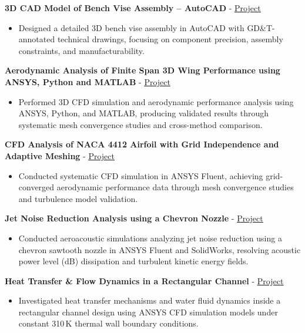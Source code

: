 \documentclass[10pt, letterpaper]{article}
\newcommand{\projheadlink}[3]{\vspace{5pt}\textbf{#1} - \href{#3}{\textcolor{linkblue}{\underline{#2}}}\par\vspace{1pt}}
\begin{document}
\projheadlink{3D CAD Model of Bench Vise Assembly -- AutoCAD}{Project}{https://www.linkedin.com/posts/jaykumar-prajapati_autocad-3dmodeling-mechanicalengineering-activity-7296754704766681088-dPDm}
\begin{itemize}
  \item Designed a detailed 3D bench vise assembly in AutoCAD with GD\&T-annotated technical drawings, focusing on component precision, assembly constraints, and manufacturability.
\end{itemize}

\projheadlink{Aerodynamic Analysis of Finite Span 3D Wing Performance using ANSYS, Python and MATLAB}{Project}{https://www.linkedin.com/posts/jaykumar-prajapati_aerodynamics-cfd-finitespanwing-activity-7300952489443434497-08Zf}
\begin{itemize}
  \item Performed 3D CFD simulation and aerodynamic performance analysis using ANSYS, Python, and MATLAB, producing validated results through systematic mesh convergence studies and cross-method comparison.
\end{itemize}

\projheadlink{CFD Analysis of NACA 4412 Airfoil with Grid Independence and Adaptive Meshing}{Project}{https://www.linkedin.com/posts/jaykumar-prajapati_cfd-aerodynamics-engineering-activity-7301811668550856706-MpND}
\begin{itemize}
  \item Conducted systematic CFD simulation in ANSYS Fluent, achieving grid-converged aerodynamic performance data through mesh convergence studies and turbulence model validation.
\end{itemize}

\projheadlink{Jet Noise Reduction Analysis using a Chevron Nozzle}{Project}{https://www.linkedin.com/posts/jaykumar-prajapati_cfd-acoustics-jetnoise-activity-7314003365615542273-X1GT}
\begin{itemize}
  \item Conducted aeroacoustic simulations analyzing jet noise reduction using a chevron sawtooth nozzle in ANSYS Fluent and SolidWorks, resolving acoustic power level (dB) dissipation and turbulent kinetic energy fields.
\end{itemize}

\projheadlink{Heat Transfer & Flow Dynamics in a Rectangular Channel}{Project}{https://www.linkedin.com/posts/jaykumar-prajapati_cfd-heattransfer-engineering-activity-7291233894811549696-VFuH}
\begin{itemize}
  \item Investigated heat transfer mechanisms and water fluid dynamics inside a rectangular channel design using ANSYS CFD simulation models under constant 310\,K thermal wall boundary conditions.
\end{itemize}
\end{document}
